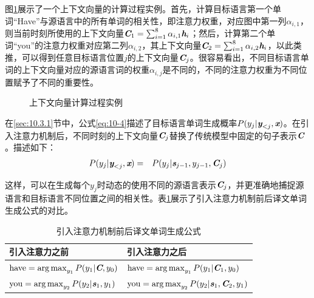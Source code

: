 \parinterval 图\ref{fig:10-21}展示了一个上下文向量的计算过程实例。首先，计算目标语言第一个单词“Have”与源语言中的所有单词的相关性，即注意力权重，对应图中第一列$\alpha_{i,1}$，则当前时刻所使用的上下文向量$\textbf{\em C}_1 = \sum_{i=1}^8 \alpha_{i,1} \textbf{\em h}_i$；然后，计算第二个单词“you”的注意力权重对应第二列$\alpha_{i,2}$，其上下文向量$\textbf{\em C}_2 = \sum_{i=1}^8 \alpha_{i,2} \textbf{\em h}_i$，以此类推，可以得到任意目标语言位置$j$的上下文向量$\textbf{\em C}_j$。很容易看出，不同目标语言单词的上下文向量对应的源语言词的权重$\alpha_{i,j}$是不同的，不同的注意力权重为不同位置赋予了不同的重要性。

\begin{figure}[htp]
\centering

\caption{上下文向量计算过程实例}
\label{fig:10-21}
\end{figure}

\parinterval 在\ref{sec:10.3.1}节中，公式\eqref{eq:10-4}描述了目标语言单词生成概率$ {P} (y_j | \textbf{\em y}_{<j},\textbf{\em x})$。在引入注意力机制后，不同时刻的上下文向量$\textbf{\em C}_j$替换了传统模型中固定的句子表示$\textbf{\em C}$。描述如下：
\begin{eqnarray}
{P} (y_j | \textbf{\em y}_{<j},\textbf{\em x}) &=& {P} (y_j | \textbf{\em s}_{j-1},y_{j-1},\textbf{\em C}_j )
\label{eq:10-20}
\end{eqnarray}

\parinterval 这样，可以在生成每个$y_j$时动态的使用不同的源语言表示$\textbf{\em C}_j$，并更准确地捕捉源语言和目标语言不同位置之间的相关性。表\ref{tab:10-7}展示了引入注意力机制前后译文单词生成公式的对比。
\vspace{0.5em}

\begin{table}[htp]
\centering
\caption{引入注意力机制前后译文单词生成公式}
\label{tab:10-7}
\begin{tabular}{ l | l }
\rule{0pt}{13pt}	引入注意力之前			&引入注意力之后 \\ \hline
\rule{0pt}{16pt}	$\textrm{have} = \operatorname*{arg\,max}_{y_1}  {P} (y_1 | \textbf{\em C} , y_0)$		&$\textrm{have} = \operatorname*{arg\,max}_{y_1}  {P} (y_1 | \textbf{\em C}_1 , y_0)$	\\
\rule{0pt}{16pt}	$\textrm{you} = \operatorname*{arg\,max}_{y_2} {P} (y_2 | \textbf{\em s}_1 , y_1)$			&$\textrm{you} = \operatorname*{arg\,max}_{y_2} {P} (y_2 | \textbf{\em s}_1, \textbf{\em C}_2 , y_1)$	\\
\end{tabular}
\end{table}

